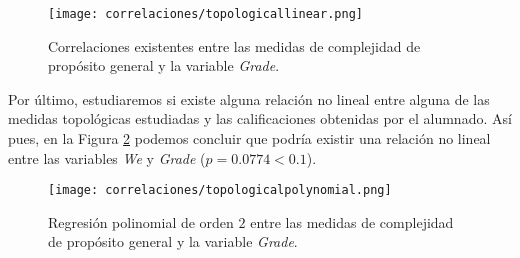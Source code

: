 \begin{figure}[H]
    \centering
    \texttt{[image: correlaciones/topologicallinear.png]}
    \caption{Correlaciones existentes entre las medidas de complejidad de propósito general y la variable \emph{Grade}.}
    \label{fig:correlations3}
\end{figure}

Por último, estudiaremos si existe alguna relación no lineal entre alguna de las medidas topológicas estudiadas y las calificaciones obtenidas por el alumnado. Así pues, en la Figura \ref{fig:correlations4} podemos concluir que podría existir una relación no lineal entre las variables \emph{We} y \emph{Grade} ($p = 0.0774 < 0.1$).

\begin{figure}[H]
    \centering
    \texttt{[image: correlaciones/topologicalpolynomial.png]}
    \caption{Regresión polinomial de orden $2$ entre las medidas de complejidad de propósito general y la variable \emph{Grade}.}
    \label{fig:correlations4}
\end{figure}